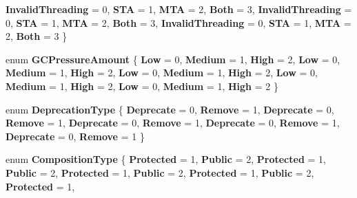 \begin{DoxyCompactItemize}
{\bfseries Invalid\+Threading} = 0, 
{\bfseries S\+TA} = 1, 
{\bfseries M\+TA} = 2, 
{\bfseries Both} = 3, 
\newline
{\bfseries Invalid\+Threading} = 0, 
{\bfseries S\+TA} = 1, 
{\bfseries M\+TA} = 2, 
{\bfseries Both} = 3, 
\newline
{\bfseries Invalid\+Threading} = 0, 
{\bfseries S\+TA} = 1, 
{\bfseries M\+TA} = 2, 
{\bfseries Both} = 3
 \}
\item 
\mbox{\label{namespace_windows_1_1_foundation_1_1_metadata_a877de1cc5a89f9df6ace56ccf9883aa4}} 
enum {\bfseries G\+C\+Pressure\+Amount} \{ \newline
{\bfseries Low} = 0, 
{\bfseries Medium} = 1, 
{\bfseries High} = 2, 
{\bfseries Low} = 0, 
\newline
{\bfseries Medium} = 1, 
{\bfseries High} = 2, 
{\bfseries Low} = 0, 
{\bfseries Medium} = 1, 
\newline
{\bfseries High} = 2, 
{\bfseries Low} = 0, 
{\bfseries Medium} = 1, 
{\bfseries High} = 2, 
\newline
{\bfseries Low} = 0, 
{\bfseries Medium} = 1, 
{\bfseries High} = 2
 \}
\item 
\mbox{\label{namespace_windows_1_1_foundation_1_1_metadata_a6012664166c4aca6e08f2f623e42d611}} 
enum {\bfseries Deprecation\+Type} \{ \newline
{\bfseries Deprecate} = 0, 
{\bfseries Remove} = 1, 
{\bfseries Deprecate} = 0, 
{\bfseries Remove} = 1, 
\newline
{\bfseries Deprecate} = 0, 
{\bfseries Remove} = 1, 
{\bfseries Deprecate} = 0, 
{\bfseries Remove} = 1, 
\newline
{\bfseries Deprecate} = 0, 
{\bfseries Remove} = 1
 \}
\item 
\mbox{\label{namespace_windows_1_1_foundation_1_1_metadata_a505a6f2bc4b2b9794234c3c04a49dab7}} 
enum {\bfseries Composition\+Type} \{ \newline
{\bfseries Protected} = 1, 
{\bfseries Public} = 2, 
{\bfseries Protected} = 1, 
{\bfseries Public} = 2, 
\newline
{\bfseries Protected} = 1, 
{\bfseries Public} = 2, 
{\bfseries Protected} = 1, 
{\bfseries Public} = 2, 
\newline
{\bfseries Protected} = 1, 

\end{DoxyCompactItemize}

